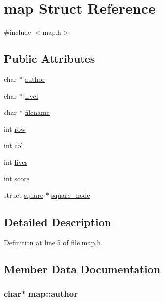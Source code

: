 \hypertarget{structmap}{\section{map Struct Reference}
\label{structmap}
}


{\ttfamily \#include $<$map.\-h$>$}

\subsection*{Public Attributes}
\begin{DoxyCompactItemize}
\item 
char $\ast$ \hyperlink{structmap_a8dcb66227c1f49b4488a6d6c65295f50}{author}
\item 
char $\ast$ \hyperlink{structmap_a8d663a5c112a6cfb7d5d60fd0e1644bf}{level}
\item 
char $\ast$ \hyperlink{structmap_a97e69cb2956cef929f4ab59bbacbbe38}{filename}
\item 
int \hyperlink{structmap_a7b68ca786a01c2030b6c387f99dcc4d2}{row}
\item 
int \hyperlink{structmap_a17f43879c500b6eda91e0cb9f15e35ef}{col}
\item 
int \hyperlink{structmap_afa4e098c337ab3f759697aea8265c088}{lives}
\item 
int \hyperlink{structmap_a95a5a344dda519e69d1a8ae730bfbc02}{score}
\item 
struct \hyperlink{structsquare}{square} $\ast$ \hyperlink{structmap_a5c8b324a106c3de305b6427292627d80}{square\-\_\-node}
\end{DoxyCompactItemize}


\subsection{Detailed Description}


Definition at line 5 of file map.\-h.



\subsection{Member Data Documentation}
\hypertarget{structmap_a8dcb66227c1f49b4488a6d6c65295f50}{
\subsubsection[{author}]{\setlength{\rightskip}{0pt plus 5cm}char$\ast$ map\-::author}}\label{structmap_a8dcb66227c1f49b4488a6d6c65295f50}


